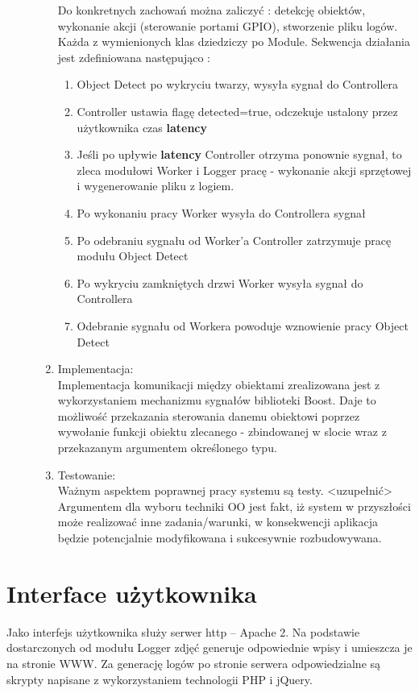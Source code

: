 \begin{description}
\begin{enumerate}[noitemsep]
Do konkretnych zachowań można zaliczyć : detekcję obiektów, wykonanie akcji (sterowanie portami GPIO), stworzenie pliku logów. Każda z wymienionych klas dziedziczy po Module.
Sekwencja działania jest zdefiniowana następująco :
\begin{enumerate}[noitemsep]
\item Object Detect po wykryciu twarzy, wysyła sygnał do Controllera
\item Controller ustawia flagę detected=true, odczekuje ustalony przez użytkownika czas \textbf{latency }
\item Jeśli po upływie \textbf{latency} Controller otrzyma ponownie sygnał, to zleca modułowi Worker i Logger pracę - wykonanie akcji sprzętowej i wygenerowanie pliku z logiem.
\item Po wykonaniu pracy Worker wysyła do Controllera sygnał
\item Po odebraniu sygnału od Worker’a Controller zatrzymuje pracę modułu Object Detect
\item Po wykryciu zamkniętych drzwi Worker wysyła sygnał do Controllera
\item Odebranie sygnału od Workera powoduje wznowienie pracy Object Detect
\end{enumerate}
\item Implementacja: \\
Implementacja komunikacji między obiektami zrealizowana jest z wykorzystaniem mechanizmu sygnałów biblioteki Boost. Daje to możliwość przekazania sterowania danemu obiektowi poprzez wywołanie funkcji obiektu zlecanego - zbindowanej w slocie wraz z przekazanym argumentem określonego typu.
\item Testowanie: \\
Ważnym aspektem poprawnej pracy systemu są testy. <uzupełnić>
Argumentem dla wyboru techniki OO jest fakt, iż system w przyszłości może realizować inne zadania/warunki, w konsekwencji aplikacja będzie potencjalnie modyfikowana i sukcesywnie rozbudowywana.
\end{enumerate}
\end{description}

\section{Interface użytkownika}
Jako interfejs użytkownika służy serwer http – Apache 2. Na podstawie dostarczonych od modułu Logger  zdjęć generuje odpowiednie wpisy i umieszcza je na stronie WWW. Za generację logów po stronie serwera odpowiedzialne są skrypty napisane z wykorzystaniem technologii PHP i jQuery.

